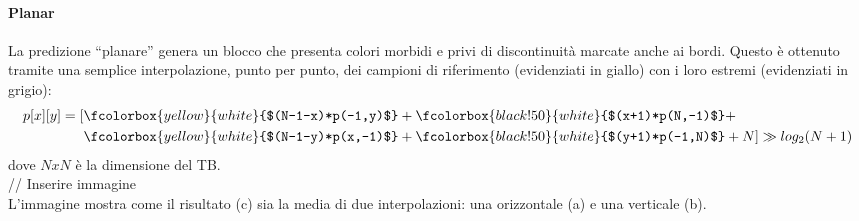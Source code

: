 \paragraph*{Planar} La predizione ``planare'' genera un blocco che presenta 
colori morbidi e privi di discontinuità marcate anche ai bordi. Questo è 
ottenuto tramite una semplice interpolazione, punto per punto, dei campioni di 
riferimento (evidenziati in giallo) con i loro estremi (evidenziati in grigio):
\begin{align*}
p[x][y] = 
[&\fcolorbox{yellow}{white}{$(N-1-x)*p(-1,y)$}+
  \fcolorbox{black!50}{white}{$(x+1)*p(N,-1)$}+\\
 &\fcolorbox{yellow}{white}{$(N-1-y)*p(x,-1)$}+
  \fcolorbox{black!50}{white}{$(y+1)*p(-1,N)$}+N] \gg log_2(N+1)
\end{align*} 
dove $NxN$ è la dimensione del TB.
\\
// Inserire immagine
\\ 
L'immagine mostra come il risultato (c) sia la media di due interpolazioni: una 
orizzontale (a) e una verticale (b).

